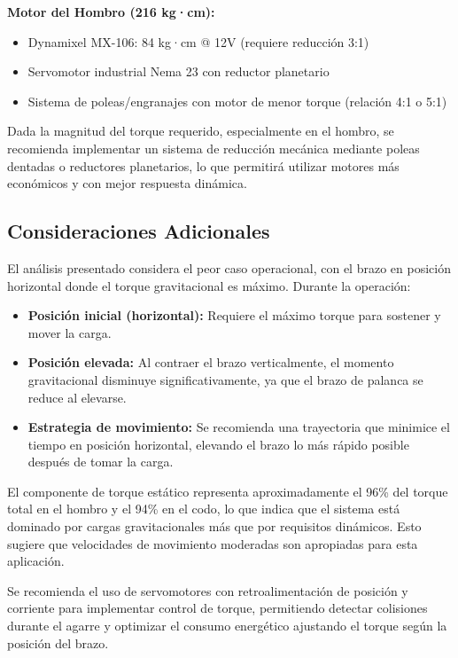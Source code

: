 \textbf{Motor del Hombro (216 kg·cm):}
\begin{itemize}
    \item Dynamixel MX-106: 84 kg·cm @ 12V (requiere reducción 3:1)
    \item Servomotor industrial Nema 23 con reductor planetario
    \item Sistema de poleas/engranajes con motor de menor torque (relación 4:1 o 5:1)
\end{itemize}

Dada la magnitud del torque requerido, especialmente en el hombro, se recomienda implementar un sistema de reducción mecánica mediante poleas dentadas o reductores planetarios, lo que permitirá utilizar motores más económicos y con mejor respuesta dinámica.

\subsection{Consideraciones Adicionales}

El análisis presentado considera el peor caso operacional, con el brazo en posición horizontal donde el torque gravitacional es máximo. Durante la operación:

\begin{itemize}
    \item \textbf{Posición inicial (horizontal):} Requiere el máximo torque para sostener y mover la carga.
    \item \textbf{Posición elevada:} Al contraer el brazo verticalmente, el momento gravitacional disminuye significativamente, ya que el brazo de palanca se reduce al elevarse.
    \item \textbf{Estrategia de movimiento:} Se recomienda una trayectoria que minimice el tiempo en posición horizontal, elevando el brazo lo más rápido posible después de tomar la carga.
\end{itemize}

El componente de torque estático representa aproximadamente el 96\% del torque total en el hombro y el 94\% en el codo, lo que indica que el sistema está dominado por cargas gravitacionales más que por requisitos dinámicos. Esto sugiere que velocidades de movimiento moderadas son apropiadas para esta aplicación.

Se recomienda el uso de servomotores con retroalimentación de posición y corriente para implementar control de torque, permitiendo detectar colisiones durante el agarre y optimizar el consumo energético ajustando el torque según la posición del brazo.